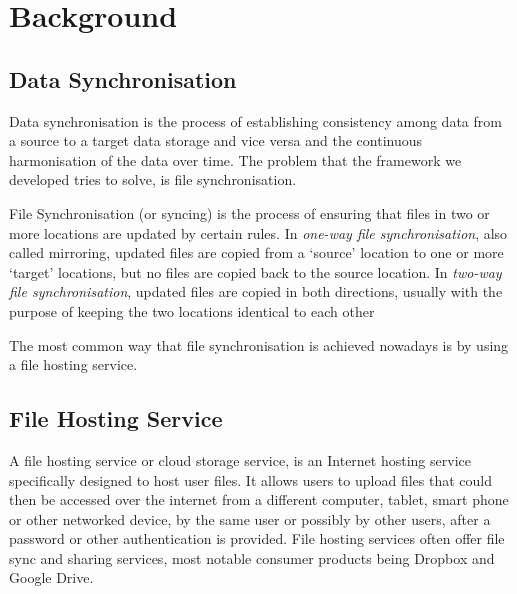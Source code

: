 
\chapter{Background}
\label{cha:background}

\section{Data Synchronisation}
  Data synchronisation is the process of establishing consistency among data from a source to a target data storage and vice versa and the continuous harmonisation of the data over time. The problem that the framework we developed tries to solve, is file synchronisation.

  File Synchronisation (or syncing) is the process of ensuring that files in two or more locations are updated by certain rules. In \emph{one-way file synchronisation}, also called mirroring, updated files are copied from a `source' location to one or more `target' locations, but no files are copied back to the source location. In \emph{two-way file synchronisation}, updated files are copied in both directions, usually with the purpose of keeping the two locations identical to each other

  The most common way that file synchronisation is achieved nowadays is by using a file hosting service.

\section{File Hosting Service}
  A file hosting service\cite{wiki-file-hosting} or cloud storage service, is an Internet hosting service specifically designed to host user files. It allows users to upload files that could then be accessed over the internet from a different computer, tablet, smart phone or other networked device, by the same user or possibly by other users, after a password or other authentication is provided. File hosting services often offer file sync and sharing services, most notable consumer products being Dropbox and Google Drive.

